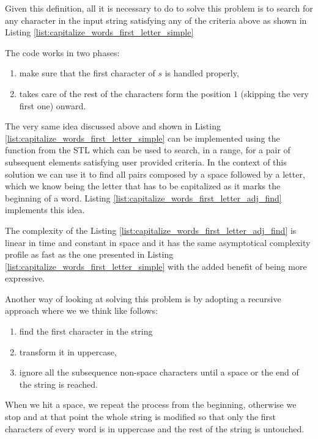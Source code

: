 Given this definition, all it is necessary to do to solve this problem is to search for any character in the input string satisfying any of the criteria above as shown in Listing \ref{list:capitalize_words_first_letter_simple}



The code works in two phases:
\begin{enumerate}
	\item make sure that the first character of $s$ is handled properly,
	\item takes care of the rest of the characters form the position $1$ (skipping the very first one) onward.
\end{enumerate}

The very same idea discussed above and shown in Listing \ref{list:capitalize_words_first_letter_simple} can be implemented using the function \cite{cit::std::adjancefind} from the STL which can be used to search, in a range, for a pair of subsequent elements satisfying  user provided criteria. In the context of this solution we can use it to find all pairs composed by a space followed by a letter, which we know being the letter that has to be capitalized as it marks the beginning of a word.
Listing \ref{list:capitalize_words_first_letter_adj_find} implements this idea. 



The complexity of the Listing \ref{list:capitalize_words_first_letter_adj_find}  is linear in time and constant in space and it has the same asymptotical complexity profile as fast as the one presented in Listing \ref{list:capitalize_words_first_letter_simple} with the added benefit of being more expressive.


Another way of looking at solving this problem is by adopting a recursive approach where we we think like follows: 
\begin{enumerate}
	\item find the first character in the string 
	\item transform it in uppercase,
	\item ignore all the subsequence non-space characters until a space or the end of the string is reached.
\end{enumerate}
When we hit a space, we repeat the process from the beginning, otherwise we stop and at that point the whole string is modified so that only the first characters of every word is in uppercase and the rest of the string is untouched.

